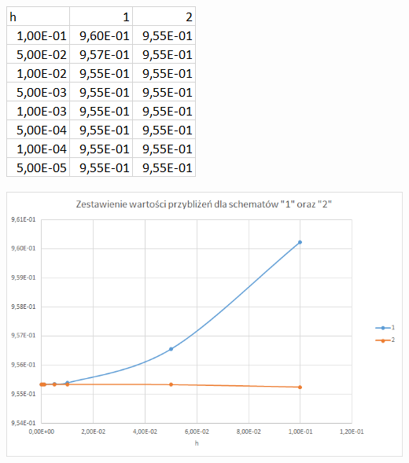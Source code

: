 \includegraphics{Lab2/charts/wsp_log_e_dane.png}

\includegraphics{Lab2/charts/wsp_e.png}
\newpage











